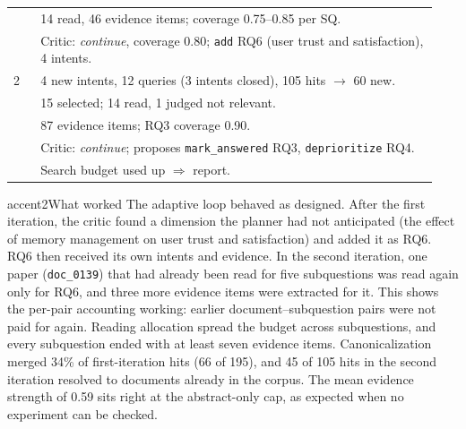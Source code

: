 \documentclass[10pt,a4paper]{article}
\newcommand{\code}[1]{\texttt{#1}}
\begin{document}
\begin{table}[t]
\begin{minipage}[t]{0.53\linewidth}
\begin{tabular}{@{}p{0.06\linewidth}p{0.88\linewidth}@{}}
  & 14 read, 46 evidence items; coverage 0.75--0.85 per SQ. \\
  & Critic: \emph{continue}, coverage 0.80; \code{add} RQ6 (user trust and satisfaction), 4 intents. \\
\midrule
2 & 4 new intents, 12 queries (3 intents closed), 105 hits $\to$ 60 new. \\
  & 15 selected; 14 read, 1 judged not relevant. \\
  & 87 evidence items; RQ3 coverage 0.90. \\
  & Critic: \emph{continue}; proposes \code{mark\_answered} RQ3, \code{deprioritize} RQ4. \\
  & Search budget used up $\Rightarrow$ report. \\
\bottomrule
\end{tabular}
\end{minipage}
\end{table}

\begin{callout}{accent2}{What worked}
The adaptive loop behaved as designed. After the
first iteration, the critic found a dimension the planner had not
anticipated (the effect of memory management on user trust and
satisfaction) and added it as RQ6. RQ6 then received its own intents and
evidence. In the second iteration, one paper (\code{doc\_0139}) that had
already been read for five subquestions was read again only for RQ6, and
three more evidence items were extracted for it. This shows the per-pair
accounting working: earlier document--subquestion pairs were not paid for
again. Reading allocation spread the budget across subquestions, and every
subquestion ended with at least seven evidence items. Canonicalization
merged 34\% of first-iteration hits (66 of 195), and 45 of 105 hits in the
second iteration resolved to documents already in the corpus. The mean
evidence strength of 0.59 sits right at the abstract-only cap, as expected
when no experiment can be checked.
\end{callout}
\end{document}
